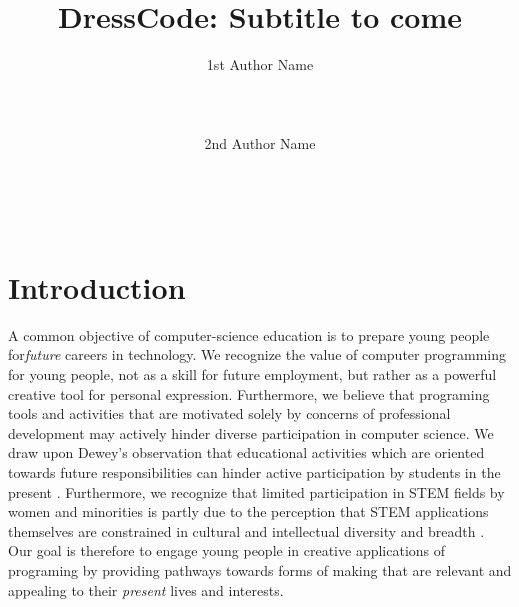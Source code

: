 \documentclass{sigchi}
\begin{document}
\title{DressCode: Subtitle to come}

\author{
 \alignauthor 1st Author Name\\
 \\
 \\
 \\
 \alignauthor 2nd Author Name\\
 \\
 \\
 \\
}

\maketitle

\begin{abstract}
\end{abstract}



\section{Introduction} %
A common objective of computer-science education is to prepare young people for\textit{future} careers in technology. We recognize the value of computer programming for young people, not as a skill for future employment, but rather as a powerful creative tool for personal expression. Furthermore, we believe that programing tools and activities that are motivated solely by concerns of professional development may actively hinder diverse participation in computer science. We draw upon Dewey's observation that educational activities which are oriented towards future responsibilities can hinder active participation by students in the present \cite{dewey}. Furthermore, we recognize that limited participation in STEM fields by women and minorities is partly due to the perception that STEM applications themselves are constrained in cultural and intellectual diversity and breadth \cite{buechley_wild}. Our goal is therefore to engage young people in creative applications of programing by providing pathways towards forms of making that are relevant and appealing to their \emph{present} lives and interests. 
\end{document}
